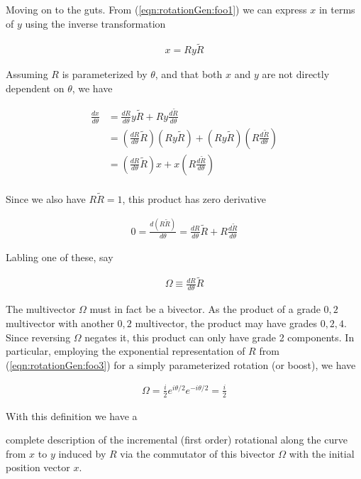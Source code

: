 Moving on to the guts.  From (\ref{eqn:rotationGen:foo1}) we can express $x$ in terms of $y$ using the inverse transformation

\begin{align}\label{eqn:rotationGen:foo10}
x = R y \tilde{R} 
\end{align}

Assuming $R$ is parameterized by $\theta$, and that both $x$ and $y$ are not directly dependent on $\theta$, we have

\begin{align*}
\frac{dx}{d\theta} 
&= 
\frac{d R}{d \theta} y \tilde{R} + R y \frac{d \tilde{R} }{d\theta} \\
&= 
\left(\frac{d R}{d \theta} \tilde{R} \right) (R y \tilde{R}) + (R y \tilde{R}) \left( R \frac{d \tilde{R} }{d\theta} \right) \\
&= 
\left(\frac{d R}{d \theta} \tilde{R} \right) x + x \left( R \frac{d \tilde{R} }{d\theta} \right) \\
\end{align*}

Since we also have $R \tilde{R} = 1$, this product has zero derivative

\begin{align*}
0 = \frac{d (R \tilde{R})}{d\theta} = \frac{d R}{d\theta} \tilde{R} + R \frac{d \tilde{R}}{d\theta} 
\end{align*}

Labling one of these, say

\begin{align}\label{eqn:rotationGen:foo11}
\Omega \equiv \frac{d R}{d\theta} \tilde{R} 
\end{align}

The multivector $\Omega$ must in fact be a bivector.  As the product of a grade $0,2$ multivector with another $0,2$ multivector, the product may have grades $0,2,4$.  Since reversing $\Omega$ negates it, this product can only have grade 2 components.  In particular, employing the exponential representation of $R$ from (\ref{eqn:rotationGen:foo3}) for a simply parameterized rotation (or boost), we have

\begin{align}\label{eqn:rotationGen:foo16}
\Omega = \frac{i}{2} e^{i \theta/2} e^{-i \theta/2} = \frac{i}{2}
\end{align}

With this definition we have a 

complete description of the incremental (first order) rotational along the curve from $x$ to $y$ induced by $R$ via the commutator of this bivector $\Omega$ with the initial position vector $x$.


